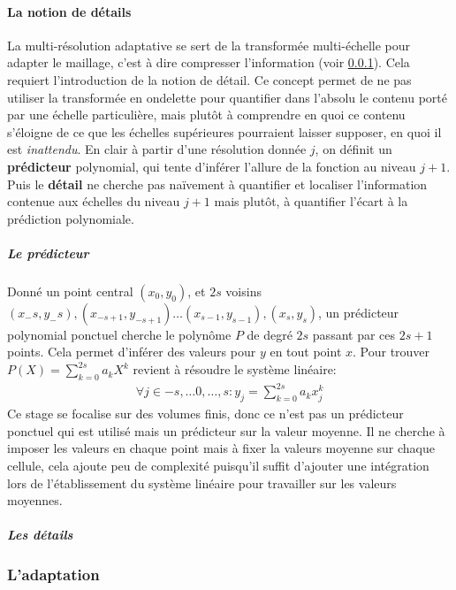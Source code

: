     \paragraph{La notion de détails}
        La multi-résolution adaptative se sert de la transformée multi-échelle pour adapter le maillage, c'est à dire compresser l'information (voir \ref{par:adaptation}).
        Cela requiert l'introduction de la notion de détail. Ce concept permet de ne pas utiliser la transformée en ondelette pour quantifier dans l'absolu le contenu porté par une échelle particulière,
        mais plutôt à comprendre en quoi ce contenu s'éloigne de ce que les échelles supérieures pourraient laisser supposer, en quoi il est \textit{inattendu}.
        En clair à partir d'une résolution donnée $j$, on définit un \textbf{prédicteur} polynomial, qui tente d'inférer l'allure de la fonction au niveau $j+1$.
        Puis le \textbf{détail} ne cherche pas naïvement à quantifier et localiser l'information contenue aux échelles du niveau $j+1$ mais plutôt, 
        à quantifier l'écart à la prédiction polynomiale.
        \subparagraph{Le prédicteur}
            Donné un point central $(x_0,y_0)$, et $2s$ voisins $(x_-s,y_-s),(x_{-s+1},y_{-s+1})\dots (x_{s-1},y_{s-1}),(x_s,y_s)$, un prédicteur polynomial 
            ponctuel cherche le polynôme $P$ de degré $2s$ passant par ces $2s+1$ points. Cela permet d'inférer des valeurs pour $y$ en tout point $x$.
            Pour trouver $P(X) = \sum_{k=0}^{2s} a_k X^k$ revient à résoudre le système linéaire:
            \begin{align}
                \forall j \in {-s,\dots 0 ,\dots,s}: y_j = \sum_{k=0}^{2s} a_k x_j^k
            \end{align}
            Ce stage se focalise sur des volumes finis, donc ce n'est pas un prédicteur ponctuel qui est utilisé mais un prédicteur sur la valeur moyenne. 
            Il ne cherche à imposer les valeurs en chaque point mais à fixer la valeurs moyenne sur chaque cellule,
            cela ajoute peu de complexité puisqu'il suffit d'ajouter une intégration lors de l'établissement du système linéaire pour travailler sur les valeurs moyennes.
        \subparagraph{Les détails}

\subsubsection{L'adaptation}\label{par:adaptation}
    \paragraph{}
